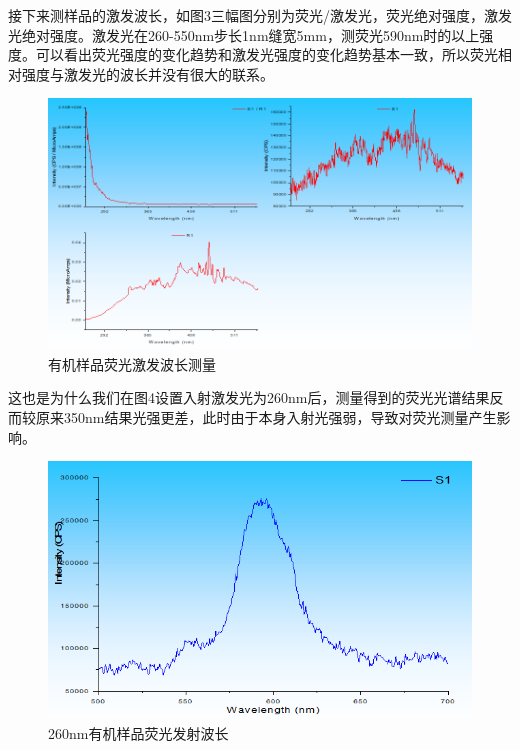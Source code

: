 \documentclass{article}
\begin{document}
	
	接下来测样品的激发波长，如图3三幅图分别为荧光/激发光，荧光绝对强度，激发光绝对强度。激发光在260-550nm步长1nm缝宽5mm，测荧光590nm时的以上强度。可以看出荧光强度的变化趋势和激发光强度的变化趋势基本一致，所以荧光相对强度与激发光的波长并没有很大的联系。
	\begin{figure}[!h]
		\centering
		\includegraphics[scale=0.8]{EX2}
		\caption{\heiti{}有机样品荧光激发波长测量}
		
	\end{figure}
	
	
	这也是为什么我们在图4设置入射激发光为260nm后，测量得到的荧光光谱结果反而较原来350nm结果光强更差，此时由于本身入射光强弱，导致对荧光测量产生影响。
	\begin{figure}[!h]
		\centering
		\includegraphics[scale=0.8]{6}
		\caption{\heiti{}260nm有机样品荧光发射波长}
		
	\end{figure}
\end{document}
